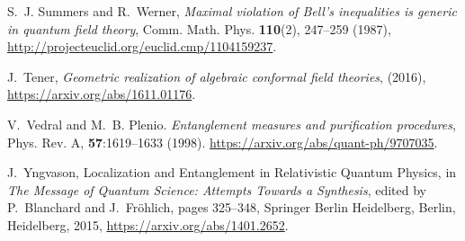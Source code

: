 \documentclass[a4paper,12pt]{article}
\theoremstyle{plain}
\theoremstyle{definition}
\theoremstyle{remark}
\begin{document}
{\begin{thebibliography}{{Haa}96}
S.~J. Summers and R.~Werner, \textsl{ Maximal violation of {B}ell's
  inequalities is generic in quantum field theory},
\newblock Comm. Math. Phys. \textbf{ 110}(2), 247--259 (1987),
\newblock \url{http://projecteuclid.org/euclid.cmp/1104159237}.

J.~Tener, \textsl{ Geometric realization of algebraic conformal field
  theories},
\newblock (2016),
\newblock \url{https://arxiv.org/abs/1611.01176}.

V.~Vedral and M.~B. Plenio.
\newblock \textsl{ Entanglement measures and purification procedures},
\newblock Phys. Rev. A, \textbf{57}:1619--1633 (1998).
\newblock \url{https://arxiv.org/abs/quant-ph/9707035}.

J.~Yngvason,
\newblock Localization and Entanglement in Relativistic Quantum Physics,
\newblock in \textsl{ The Message of Quantum Science: Attempts Towards a
  Synthesis}, edited by P.~Blanchard and J.~Fr{\"o}hlich, pages 325--348,
  Springer Berlin Heidelberg, Berlin, Heidelberg, 2015,
\newblock \url{https://arxiv.org/abs/1401.2652}.

\end{thebibliography}
}
\end{document}
